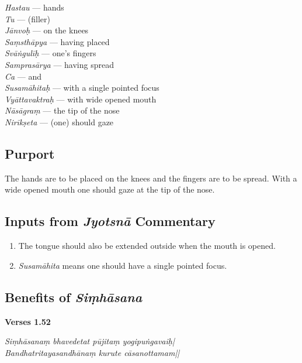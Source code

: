 \begin{multicols}{2}
\textit{Hastau} ---  hands \\
\textit{Tu} ---  (filler) \\
\textit{Jānvoḥ} ---  on the knees  \\
\textit{Saṃsthāpya} ---  having placed  \\
\textit{Svāṅgulīḥ} ---  one’s fingers  \\
\textit{Samprasārya} ---  having spread \\
\textit{Ca} ---  and \\
\textit{Susamāhitaḥ} --- with a single pointed focus  \\
\textit{Vyāttavaktraḥ} ---  with wide opened mouth  \\
\textit{Nāsāgraṃ} ---  the tip of the nose  \\
\textit{Nirīkṣeta} ---  (one) should gaze
\end{multicols}

\subsection*{Purport}

The hands are to be placed on the knees and the fingers are to be spread. With a wide opened mouth one should gaze at the tip of the nose. 

\subsection*{Inputs from \textit{Jyotsnā} Commentary}

\begin{enumerate}
\item The tongue should also be extended outside when the mouth is opened.
\item \textit{Susamāhita} means one should have a single pointed focus.
\end{enumerate}

\subsection*{Benefits of \textit{Siṃhāsana}}
\vspace{-5pt}

\noindent \textbf{Verses 1.52}

\begin{shloka}
\textit{Siṃhāsanaṃ bhavedetat pūjitaṃ yogipuṅgavaiḥ|}\\
\textit{Bandhatritayasandhānaṃ kurute cāsanottamam||}
\end{shloka}

